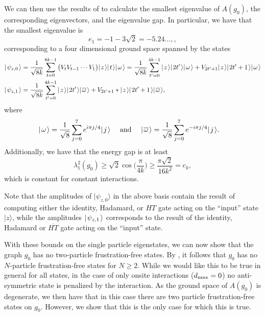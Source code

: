 \documentclass[../thesis-main/thesis-main]{subfiles}
\begin{document}
We can then use the results of  to calculate the smallest eigenvalue of $A(g_0)$, the corresponding eigenvectors, and the eigenvalue gap.  In particular, we have that the smallest eigenvalue is 
\begin{equation}
  e_1 = -1 - 3 \sqrt{2} = -5.24\ldots, \label{eq:e_1},
\end{equation}
corresponding to a four dimensional ground space spanned by the states
\begin{align}
  |\mspace{2mu} \psi_{z,0} \mspace{2mu} \rangle &= \frac{1}{\sqrt{8k}}\sum_{t=0}^{8k-1} \big(V_t V_{t-1} \cdots V_1\big) |\mspace{2mu} z \mspace{2mu} \rangle |\mspace{2mu} t \mspace{2mu} \rangle |\mspace{2mu} \omega \mspace{2mu} \rangle= \frac{1}{\sqrt{8k}}\sum_{t'=0}^{4k-1} |\mspace{2mu} z \mspace{2mu} \rangle |\mspace{2mu} 2t' \mspace{2mu} \rangle|\mspace{2mu} \omega \mspace{2mu} \rangle + V_{2t' + 1} |\mspace{2mu} z \mspace{2mu} \rangle |\mspace{2mu} 2t'+1 \mspace{2mu} \rangle|\mspace{2mu} \omega \mspace{2mu} \rangle\label{eq:psi0m}\\
  |\mspace{2mu} \psi_{z,1} \mspace{2mu} \rangle &= \frac{1}{\sqrt{8k}} \sum_{t'=0}^{4k-1} |\mspace{2mu} z \mspace{2mu} \rangle|\mspace{2mu} 2t' \mspace{2mu} \rangle |\mspace{2mu} \overline{\omega} \mspace{2mu} \rangle + V_{2t'+1}* |\mspace{2mu} z \mspace{2mu} \rangle |\mspace{2mu} 2t'+1 \mspace{2mu} \rangle |\mspace{2mu} \overline{\omega} \mspace{2mu} \rangle\label{eq:psi1m},
\end{align}
where
\begin{align*}
  |\mspace{2mu} \omega \mspace{2mu} \rangle &= \frac{1}{\sqrt{8}} \sum_{j=0}^{7} e^{i \pi j/4} |\mspace{2mu} j \mspace{2mu} \rangle &\text{ and } &&
  |\mspace{2mu} \overline{\omega} \mspace{2mu} \rangle &= \frac{1}{\sqrt{8}} \sum_{j=0}^7 e^{-i \pi j/4} |\mspace{2mu} j \mspace{2mu} \rangle.
\end{align*}
Additionally, we have that the energy gap is at least 
\begin{equation}
  \lambda_1^2(g_0) \geq \sqrt{2} \cos\Big(\frac{\pi}{4k}\Big) \geq \frac{\pi\sqrt{2}}{16 k^2} = c_k,
\end{equation}
which is constant for constant interactions.



Note that the amplitudes of $|\psi_{z,0}\rangle$ in the above basis contain the result of computing either the identity, Hadamard, or $HT$ gate acting on the ``input'' state $|z\rangle$, while the amplitudes $|\mspace{2mu} \psi_{z,1} \mspace{2mu} \rangle$ corresponds to the result of the identity, Hadamard or $\overline{HT}$ gate acting on the ``input'' state.


With these bounds on the single particle eigenstates, we can now show that the graph $g_{0}$ has no two-particle frustration-free states. By , it follows that $g_0$ has no $N$-particle frustration-free states for $N\geq 2$.  While we would like this to be true in general for all states, in the case of only onsite interactions ($d_{\text{max}} =0$) no anti-symmetric state is penalized by the interaction.  As the ground space of $A(g_0)$ is degenerate, we then have that in this case there are two particle frustration-free states on $g_0$.  However, we show that this is the only case for which this is true.
\end{document}
